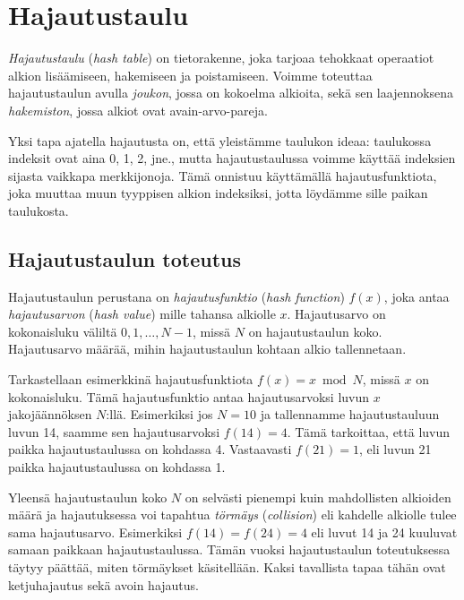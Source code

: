 \chapter{Hajautustaulu}


\emph{Hajautustaulu} (\emph{hash table}) on tietorakenne,
joka tarjoaa tehokkaat operaatiot alkion lisäämiseen,
hakemiseen ja poistamiseen.
Voimme toteuttaa hajautustaulun avulla \emph{joukon},
jossa on kokoelma alkioita, sekä sen laajennoksena
\emph{hakemiston}, jossa alkiot ovat avain-arvo-pareja.

Yksi tapa ajatella hajautusta on, että yleistämme taulukon ideaa:
taulukossa indeksit ovat aina 0, 1, 2, jne., mutta hajautustaulussa
voimme käyttää indeksien sijasta vaikkapa merkkijonoja.
Tämä onnistuu käyttämällä hajautusfunktiota,
joka muuttaa muun tyyppisen alkion indeksiksi,
jotta löydämme sille paikan taulukosta.

\section{Hajautustaulun toteutus}


Hajautustaulun perustana on \emph{hajautusfunktio}
(\emph{hash function}) $f(x)$,
joka antaa \emph{hajautusarvon} (\emph{hash value})
mille tahansa alkiolle $x$.
Hajautusarvo on kokonaisluku väliltä $0,1,\dots,N-1$,
missä $N$ on hajautustaulun koko.
Hajautusarvo määrää, mihin hajautustaulun kohtaan
alkio tallennetaan.

Tarkastellaan esimerkkinä hajautusfunktiota $f(x)=x \bmod N$,
missä $x$ on kokonaisluku.
Tämä hajautusfunktio antaa hajautusarvoksi luvun $x$
jakojäännöksen $N$:llä.
Esimerkiksi jos $N=10$ ja tallennamme hajautustauluun luvun 14,
saamme sen hajautusarvoksi $f(14)=4$.
Tämä tarkoittaa, että luvun paikka hajautustaulussa on kohdassa 4.
Vastaavasti $f(21)=1$, eli luvun 21 paikka hajautustaulussa on
kohdassa 1.


Yleensä hajautustaulun koko $N$ on selvästi pienempi kuin
mahdollisten alkioiden määrä ja
hajautuksessa voi tapahtua \emph{törmäys} (\emph{collision})
eli kahdelle alkiolle tulee sama hajautusarvo.
Esimerkiksi $f(14)=f(24)=4$ eli luvut 14 ja 24 kuuluvat
samaan paikkaan hajautustaulussa.
Tämän vuoksi hajautustaulun toteutuksessa täytyy päättää,
miten tör\-mäykset käsitellään.
Kaksi tavallista tapaa tähän ovat ketjuhajautus sekä avoin hajautus.

